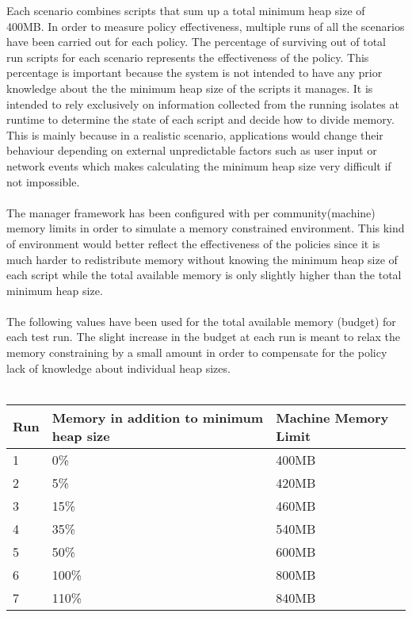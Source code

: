 \documentclass{l4proj}
\begin{document}
\hspace*{3em} Each scenario combines scripts that sum up a total minimum heap size of 400MB. In order to measure policy effectiveness, multiple runs of all the scenarios have been carried out for each policy. The percentage of surviving out of total run scripts for each scenario represents the effectiveness of the policy. This percentage is important because the system is not intended to have any prior knowledge about the the minimum heap size of the scripts it manages. It is intended to rely exclusively on information collected from the running isolates at runtime to determine the state of each script and decide how to divide memory. This is mainly because in a realistic scenario, applications would change their behaviour depending on external unpredictable factors such as user input or network events which makes calculating the minimum heap size very difficult if not impossible. 
\\\\
The manager framework has been configured with per community(machine) memory limits in order to simulate a memory constrained environment. This kind of environment would better reflect the effectiveness of the policies since it is much harder to redistribute memory without knowing the minimum heap size of each script while the total available memory is only slightly higher than the total minimum heap size.
\\\\
The following values have been used for the total available memory (budget) for each test run. The slight increase in the budget at each run is meant to relax the memory constraining by a small amount in order to compensate for the policy lack of knowledge about individual heap sizes. 
\\\\
\begin{tabular}{  | l | l | l | }
\hline  
  Run & Memory in addition to minimum heap size & Machine Memory Limit \\
\hline
  1 & 0\% & 400MB \\
\hline
  2 & 5\% & 420MB \\
\hline  
  3 & 15\% & 460MB \\
\hline  
  4 & 35\% & 540MB \\
\hline  
  5 & 50\% & 600MB \\
\hline  
  6 & 100\% & 800MB \\
\hline
  7 & 110\% & 840MB \\
\hline
\end{tabular}
\end{document}
